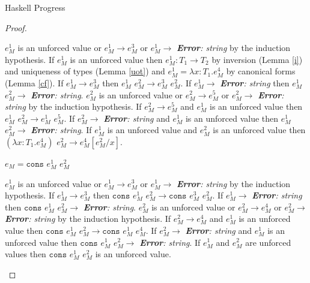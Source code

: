 \begin{theorem}{Haskell Progress}
\begin{proof}
\begin{case}
$e_{M}^{1}$ is an unforced value or $e_{M}^{1}\rightarrow e_{M}^{3}$ or $e_{M}^{1}\rightarrow$ \emph{\textbf{Error}: string} by the induction hypothesis.  If $e_{M}^{1}$ is an unforced value then $e_{M}^{1}:T_{1}\rightarrow T_{2}$ by inversion (Lemma \ref{i}) and uniqueness of types (Lemma \ref{uot}) and $e_{M}^{1}=\lambda x:T_{1}.e_{M}^{4}$ by canonical forms (Lemma \ref{cf}).  If $e_{M}^{1}\rightarrow e_{M}^{3}$ then $e_{M}^{1}$ $e_{M}^{2}\rightarrow e_{M}^{3}$ $e_{M}^{2}$.  If $e_{M}^{1}\rightarrow$ \emph{\textbf{Error}: string} then $e_{M}^{1}$ $e_{M}^{2}\rightarrow$ \emph{\textbf{Error}: string}.  $e_{M}^{2}$ is an unforced value or $e_{M}^{2}\rightarrow e_{M}^{5}$ or $e_{M}^{2}\rightarrow$ \emph{\textbf{Error}: string} by the induction hypothesis.  If $e_{M}^{2}\rightarrow e_{M}^{5}$ and $e_{M}^{1}$ is an unforced value then $e_{M}^{1}$ $e_{M}^{2}\rightarrow e_{M}^{1}$ $e_{M}^{5}$.  If $e_{M}^{2}\rightarrow$ \emph{\textbf{Error}: string} and $e_{M}^{1}$ is an unforced value then $e_{M}^{1}$ $e_{M}^{2}\rightarrow$ \emph{\textbf{Error}: string}.  If $e_{M}^{1}$ is an unforced value and $e_{M}^{2}$ is an unforced value then $(\lambda x:T_{1}.e_{M}^{4})$ $e_{M}^{2}\rightarrow e_{M}^{4}[e_{M}^{2}/x]$.

\end{case}


\begin{case}

$e_{M}=\mathtt{cons}$ $e_{M}^{1}$ $e_{M}^{2}$

$e_{M}^{1}$ is an unforced value or $e_{M}^{1}\rightarrow e_{M}^{3}$ or $e_{M}^{1}\rightarrow$ \emph{\textbf{Error}: string} by the induction hypothesis.  If $e_{M}^{1}\rightarrow e_{M}^{3}$ then $\mathtt{cons}$ $e_{M}^{1}$ $e_{M}^{2}\rightarrow\mathtt{cons}$ $e_{M}^{3}$ $e_{M}^{2}$.  If $e_{M}^{1}\rightarrow$ \emph{\textbf{Error}: string} then $\mathtt{cons}$ $e_{M}^{1}$ $e_{M}^{2}\rightarrow$ \emph{\textbf{Error}: string}.  $e_{M}^{2}$ is an unforced value or $e_{M}^{2}\rightarrow e_{M}^{4}$ or $e_{M}^{2}\rightarrow$ \emph{\textbf{Error}: string} by the induction hypothesis.  If $e_{M}^{2}\rightarrow e_{M}^{4}$ and $e_{M}^{1}$ is an unforced value then $\mathtt{cons}$ $e_{M}^{1}$ $e_{M}^{2}\rightarrow\mathtt{cons}$ $e_{M}^{1}$ $e_{M}^{4}$.  If $e_{M}^{2}\rightarrow$ \emph{\textbf{Error}: string} and $e_{M}^{1}$ is an unforced value then $\mathtt{cons}$ $e_{M}^{1}$ $e_{M}^{2}\rightarrow$ \emph{\textbf{Error}: string}.  If $e_{M}^{1}$ and $e_{M}^{2}$ are unforced values then $\mathtt{cons}$ $e_{M}^{1}$ $e_{M}^{2}$ is an unforced value.


\end{case}
\end{proof}
\end{theorem}
